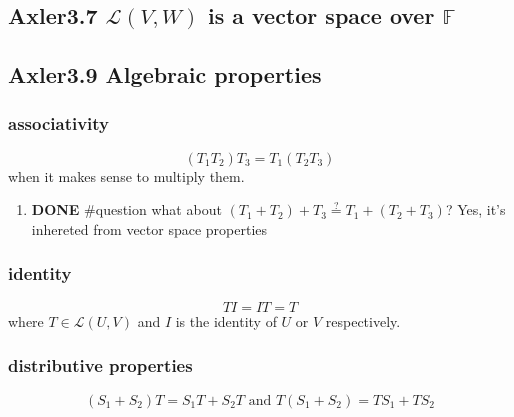 \documentclass[letterpaper]{article}
\begin{document}
\subsection{Axler3.7 \(\mathcal{L}(V, W)\) is a vector space over \(\mathbb{F}\)}
\label{sec:org1250eeb}

\subsection{Axler3.9 Algebraic properties}
\label{sec:org68dfbd3}

\subsubsection{associativity}
\label{sec:org3d310a6}
$$(T_1 T_2) T_3 = T_1 (T_2 T_3)$$ when it makes sense to multiply them.

\begin{enumerate}
\item {\bfseries\sffamily DONE} \#question what about \((T_1 + T_2) + T_3 \stackrel{?}{=} T_1 + (T_2 + T_3)\)?
\label{sec:org6420f83}
Yes, it's inhereted from vector space properties
\end{enumerate}

\subsubsection{identity}
\label{sec:org2cea82f}
$$TI = IT = T$$ where \(T \in \mathcal L(U, V)\) and \(I\) is the identity of \(U\) or \(V\) respectively.

\subsubsection{distributive properties}
\label{sec:orgde80ab3}
$$(S_1 + S_2)T = S_1T + S_2T \text{  and  } T(S_1 + S_2) = TS_1 + TS_2$$
\end{document}
